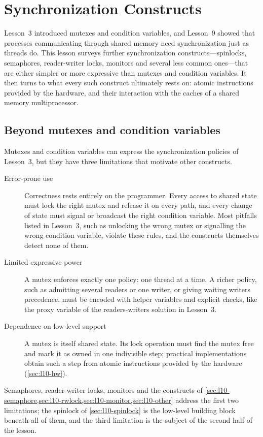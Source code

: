 \documentclass[../main.tex]{subfiles}
\begin{document}
\chapter{Synchronization Constructs}

Lesson~3 introduced mutexes and condition variables, and Lesson~9 showed
that processes communicating through shared memory need synchronization
just as threads do.  This lesson surveys further synchronization
constructs---spinlocks, semaphores, reader-writer locks, monitors and
several less common ones---that are either simpler or more expressive than
mutexes and condition variables.  It then turns to what every such
construct ultimately rests on: atomic instructions provided by the
hardware, and their interaction with the caches of a shared memory
multiprocessor.

\section{Beyond mutexes and condition variables}
\label{sec:l10-limits}

Mutexes and condition variables can express the synchronization policies
of Lesson~3, but they have three limitations that motivate other
constructs.
\begin{description}
  \item[Error-prone use] Correctness rests entirely on the programmer.
    Every access to shared state must lock the right mutex and release it
    on every path, and every change of state must signal or broadcast the
    right condition variable.  Most pitfalls listed in Lesson~3, such as
    unlocking the wrong mutex or signalling the wrong condition variable,
    violate these rules, and the constructs themselves detect none of
    them.
  \item[Limited expressive power] A mutex enforces exactly one policy: one
    thread at a time.  A richer policy, such as admitting several readers
    or one writer, or giving waiting writers precedence, must be encoded
    with helper variables and explicit checks, like the proxy variable of
    the readers-writers solution in Lesson~3.
  \item[Dependence on low-level support] A mutex is itself shared state.
    Its lock operation must find the mutex free and mark it as owned in
    one indivisible step; practical implementations obtain such a step
    from atomic instructions provided by the hardware
    (\cref{sec:l10-hw}).
\end{description}
Semaphores, reader-writer locks, monitors and the constructs of
\cref{sec:l10-semaphore,sec:l10-rwlock,sec:l10-monitor,sec:l10-other}
address the first two limitations; the spinlock of \cref{sec:l10-spinlock}
is the low-level building block beneath all of them, and the third
limitation is the subject of the second half of the lesson.
\end{document}

